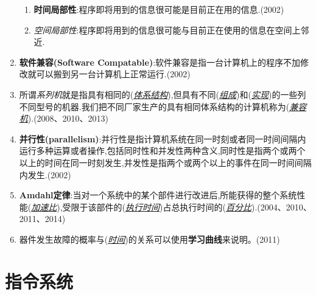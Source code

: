 \documentclass[a4paper]{ctexart}
\newcommand{\blank}[1]{(\emph{\underline{#1}})}
\begin{document}
\begin{enumerate}
  \begin{enumerate}
    \item \textbf{时间局部性}:程序即将用到的信息很可能是目前正在用的信息.(2002)
    \item \emph{空间局部性}:程序即将用到的信息很可能与目前正在使用的信息在空间上邻近.
  \end{enumerate}
  \item \textbf{软件兼容(Software Compatable)}:软件兼容是指一台计算机上的程序不加修改就可以搬到另一台计算机上正常运行.(2002)
  \item 所谓\emph{系列机}就是指具有相同的(\emph{\underline{体系结构}}),但具有不同(\emph{\underline{组成}})和(\emph{\underline{实现}})的一些列不同型号的机器.我们把不同厂家生产的具有相同体系结构的计算机称为(\emph{\underline{兼容机}}).(2008、2010、2013)
  \item \textbf{并行性(parallelism)}:并行性是指计算机系统在同一时刻或者同一时间间隔内运行多种运算或者操作,包括同时性和并发性两种含义,同时性是指两个或两个以上的时间在同一时刻发生,并发性是指两个或两个以上的事件在同一时间间隔内发生.(2002)
  \item \textbf{Amdahl定律}:当对一个系统中的某个部件进行改进后,所能获得的整个系统性能\blank{加速比},受限于该部件的\blank{执行时间}占总执行时间的\blank{百分比}.(2004、2010、2011、2014)
  \item 器件发生故障的概率与\blank{时间}的关系可以使用\textbf{学习曲线}来说明。(2011)
\end{enumerate}

\newpage
\section{指令系统}
\end{document}
